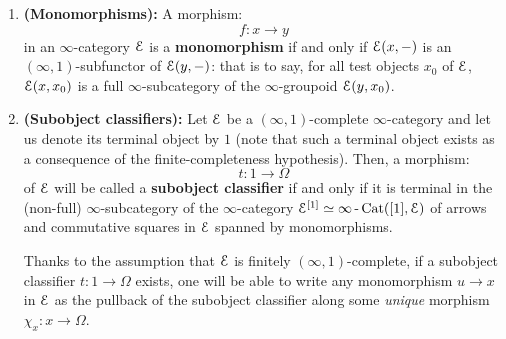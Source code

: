                 \begin{definition} \label{def: subobject_classifiers}
                    \noindent
                    \begin{enumerate}
                        \item \textbf{(Monomorphisms):} A morphism:
                            $$f: x \to y$$
                        in an $\infty$-category $\mathcal{E}$ is a \textbf{monomorphism} if and only if $\mathcal{E}(x, -)$ is an $(\infty, 1)$-subfunctor of $\mathcal{E}(y, -)$: that is to say, for all test objects $x_0$ of $\mathcal{E}$, $\mathcal{E}(x, x_0)$ is a full $\infty$-subcategory of the $\infty$-groupoid $\mathcal{E}(y, x_0)$. 
                        \item \textbf{(Subobject classifiers):} Let $\mathcal{E}$ be a $(\infty, 1)$-complete $\infty$-category and let us denote its terminal object by $1$ (note that such a terminal object exists as a consequence of the finite-completeness hypothesis). Then, a morphism:
                            $$t: 1 \to \Omega$$
                        of $\mathcal{E}$ will be called a \textbf{subobject classifier} if and only if it is terminal in the (non-full) $\infty$-subcategory of the $\infty$-category $\mathcal{E}^{[1]} \simeq \infty\operatorname{-}\mathrm{Cat}([1], \mathcal{E})$ of arrows and commutative squares in $\mathcal{E}$ spanned by monomorphisms.
                        
                        Thanks to the assumption that $\mathcal{E}$ is finitely $(\infty, 1)$-complete, if a subobject classifier $t: 1 \to \Omega$ exists, one will be able to write any monomorphism $u \to x$ in $\mathcal{E}$ as the pullback of the subobject classifier along some \textit{unique} morphism $\chi_x: x \to \Omega$.
                    \end{enumerate}
                \end{definition}
                
